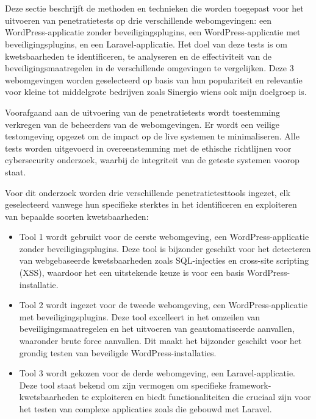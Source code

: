 \section{}
Deze sectie beschrijft de methoden en technieken die worden toegepast voor het uitvoeren van penetratietests op drie 
verschillende webomgevingen: een WordPress-applicatie zonder beveiligingsplugins, een WordPress-applicatie met 
beveiligingsplugins, en een Laravel-applicatie. Het doel van deze tests is om kwetsbaarheden te identificeren, te 
analyseren en de effectiviteit van de beveiligingsmaatregelen in de verschillende omgevingen te vergelijken.
Deze 3 webomgevingen worden geselecteerd op basis van hun populariteit en relevantie voor kleine tot middelgrote bedrijven 
zoals Sinergio wiens ook mijn doelgroep is.

Voorafgaand aan de uitvoering van de penetratietests wordt toestemming verkregen van de beheerders van de 
webomgevingen. Er wordt een veilige testomgeving opgezet om de impact op de live systemen te minimaliseren. 
Alle tests worden uitgevoerd in overeenstemming met de ethische richtlijnen voor cybersecurity onderzoek, 
waarbij de integriteit van de geteste systemen voorop staat.

Voor dit onderzoek worden drie verschillende penetratietesttools ingezet, elk geselecteerd vanwege hun 
specifieke sterktes in het identificeren en exploiteren van bepaalde soorten kwetsbaarheden:

\begin{itemize}
    \item Tool 1 wordt gebruikt voor de eerste webomgeving, een WordPress-applicatie zonder 
    beveiligingsplugins. Deze tool is bijzonder geschikt voor het detecteren van webgebaseerde kwetsbaarheden 
    zoals SQL-injecties en cross-site scripting (XSS), waardoor het een uitstekende keuze is voor 
    een basis WordPress-installatie.
    \item Tool 2 wordt ingezet voor de tweede webomgeving, een WordPress-applicatie met beveiligingsplugins. 
    Deze tool excelleert in het omzeilen van beveiligingsmaatregelen en het uitvoeren van geautomatiseerde 
    aanvallen, waaronder brute force aanvallen. Dit maakt het bijzonder geschikt voor het grondig 
    testen van beveiligde WordPress-installaties.
    \item Tool 3 wordt gekozen voor de derde webomgeving, een Laravel-applicatie. Deze tool staat 
    bekend om zijn vermogen om specifieke framework-kwetsbaarheden te exploiteren en biedt functionaliteiten 
    die cruciaal zijn voor het testen van complexe applicaties zoals die gebouwd met Laravel.
\end{itemize}

